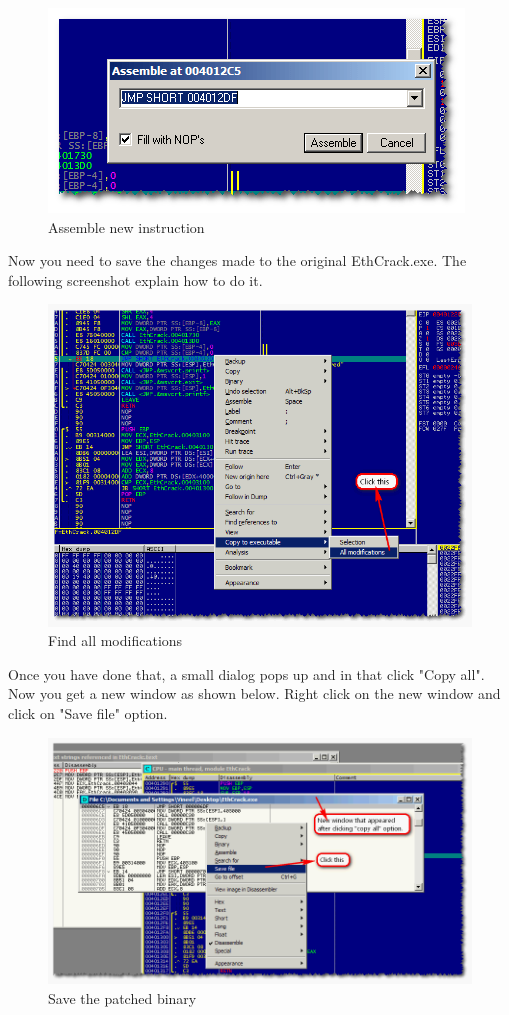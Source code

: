 \documentclass{article}
\begin{document}
\begin{figure}[H]
\centering
\includegraphics[width=\textwidth]{EthicalCracking5.png}
\caption{Assemble new instruction}
\end{figure}
Now you need to save the changes made to the original EthCrack.exe. The following screenshot explain how to do it.
\begin{figure}[H]
\centering
\includegraphics[width=\textwidth]{EthicalCracking6.png}
\caption{Find all modifications}
\end{figure}
Once you have done that, a small dialog pops up and in that click "Copy all". Now you get a new window as shown below. Right click on the new window and click on "Save file" option.
\begin{figure}[H]
\centering
\includegraphics[width=\textwidth]{EthicalCracking7.png}
\caption{Save the patched binary}
\end{figure}
\end{document}
